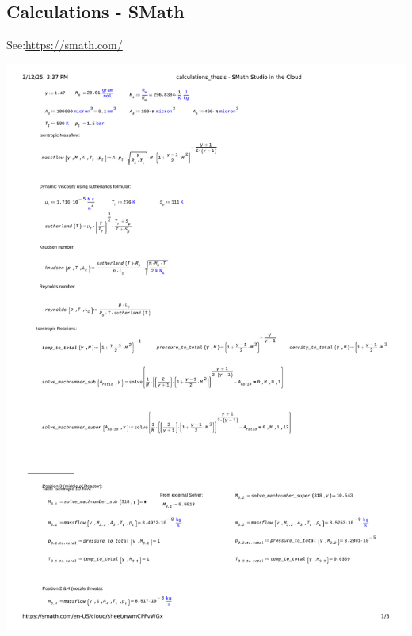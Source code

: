 \subsection{Calculations - SMath}
\label{apx:smath}
See:\quad \url{https://smath.com/}

\includegraphics[page=1, width=\textwidth]{code/smath.pdf}
\newpage
